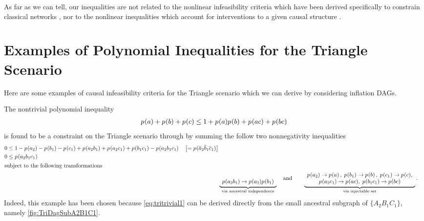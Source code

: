 

As far as we can tell, our inequalities are not related to the nonlinear infeasibility criteria which have been derived specifically to constrain classical networks \cite{TavakoliStarNetworks,RossetNetworks,TavakoliNoncyclicNetworks}, nor to the nonlinear inequalities which account for interventions to a given causal structure \cite{kang2007polynomialconstraints,steeg2011relaxation}.

\section{Examples of Polynomial Inequalities for the Triangle Scenario}\label{sec:examplebaddistributions}


Here are some examples of causal infeasibility criteria for the Triangle scenario which we can derive by considering inflation DAGs.

The nontrivial polynomial inequality 
\begin{align}\label{eq:tritrivial1}
{{p_{}}\lparen a\rparen + {p_{}}\lparen b\rparen + {p_{}}\lparen c\rparen} \leq {1 + {p_{}}\lparen a\rparen {p_{}}\lparen b\rparen + {p_{}}\lparen a c\rparen + {p_{}}\lparen b c\rparen}
\end{align}
is found to be a constraint on the Triangle scenario through by summing the follow two nonnegativity inequalities
\begin{align}\begin{split}\label{eq:trisimplestunmapped}
 &0\leq  1 -{p_{}}\lparen a_2\rparen - {p_{}}\lparen b_1\rparen - {p_{}}\lparen c_1\rparen+ {p_{}}\lparen a_2 b_1\rparen + {p_{}}\lparen a_2 c_1\rparen + {p_{}}\lparen b_1 c_1\rparen  -{p_{}}\lparen a_2 b_1 c_1\rparen \quad\left[={p_{}}\lparen\overline{a}_2 \overline{b}_1 \overline{c}_1\rparen\right]
\\&0\leq {p_{}}\lparen a_2 b_1 c_1\rparen
\end{split}\\
\shortintertext{subject to the following transformations}
&  \underbrace{\begin{array}{l}\\{p_{}}\lparen a_2 b_1\rparen \to {p_{}}\lparen a_2\rparen {p_{}}\lparen b_1\rparen\end{array}}_{\text{via ancestral independence}} \quad \text{and}\qquad
 \underbrace{\begin{array}{c}
 {p_{}}\lparen a_2\rparen\to{p_{}}\lparen a\rparen\,, 
\; {p_{}}\lparen b_1\rparen\to{p_{}}\lparen b\rparen\,, 
\; {p_{}}\lparen c_1\rparen\to{p_{}}\lparen c\rparen,
\\ {p_{}}\lparen a_2 c_1\rparen\to {p_{}}\lparen a c\rparen,
\; {p_{}}\lparen b_1 c_1\rparen\to {p_{}}\lparen b c\rparen
\end{array}}_{\text{via injectable set}}.
\end{align}
Indeed, this example has been chosen because \cref{eq:tritrivial1} can be derived directly from the small ancestral subgraph of $\{A_2 B_1 C_1\}$, namely \cref{fig:TriDagSubA2B1C1}.

